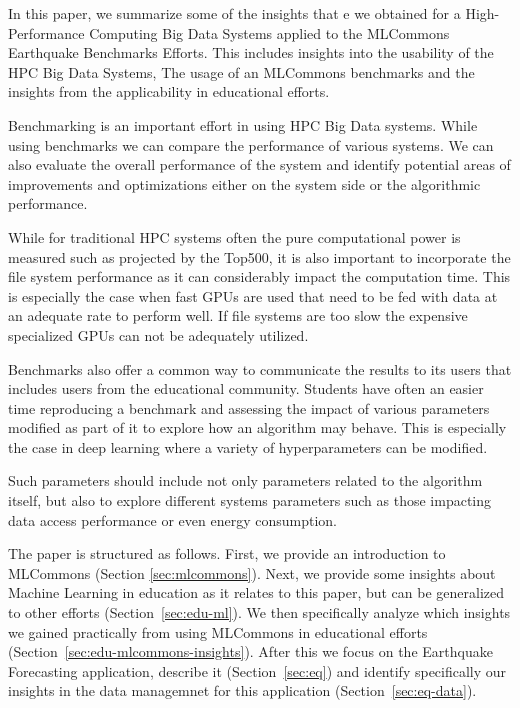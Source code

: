 \documentclass[utf8]{FrontiersinVancouver} %
\begin{document}
In this paper, we summarize some of the insights that e we obtained for
a High-Performance Computing Big Data Systems applied to the
MLCommons Earthquake Benchmarks Efforts. This includes
insights into the usability of the HPC Big Data Systems, The usage of
an MLCommons benchmarks and the insights from the applicability in
educational efforts.

Benchmarking is an important effort in using HPC Big Data systems.
While using benchmarks we can compare the performance of various
systems.  We can also evaluate the overall performance of the system
and identify potential areas of improvements and optimizations
either on the system side or the algorithmic performance.

While for traditional HPC systems often the pure
computational power is measured such as projected by the Top500, it is
also important to incorporate the file system performance as it can
considerably impact the computation time. This is especially the case
when fast GPUs are used that need to be fed with data at an adequate
rate to perform well. If file systems are too slow the expensive
specialized GPUs can not be adequately utilized.

Benchmarks also offer a common way to communicate the results to its
users that includes users from the educational community. Students
have often an easier time reproducing a benchmark and assessing the
impact of various parameters modified as part of it to explore how an
algorithm may behave. This is especially the case in deep learning
where a variety of hyperparameters can be modified.

Such parameters should include not only parameters related to
the algorithm itself, but also to explore different systems parameters
such as those impacting data access performance or even energy
consumption.

The paper is structured as follows. First, we provide an introduction to
MLCommons (Section \ref{sec:mlcommons}).  Next, we provide some
insights about Machine Learning in education as it relates to this
paper, but can be generalized to other efforts
(Section~\ref{sec:edu-ml}). We then specifically analyze which
insights we gained practically from using MLCommons in educational
efforts (Section~\ref{sec:edu-mlcommons-insights}). After this we
focus on the Earthquake Forecasting application, describe it
(Section~\ref{sec:eq}) and identify specifically our insights in the
data managemnet for this application (Section~\ref{sec:eq-data}).
\end{document}
